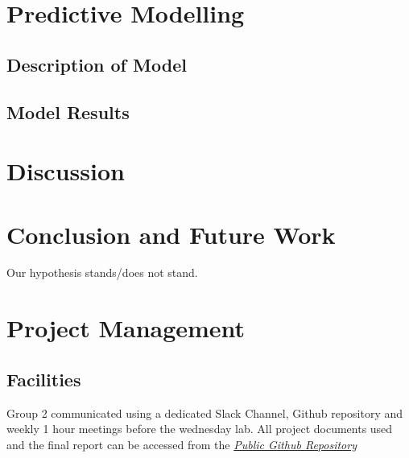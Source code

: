 \documentclass[10pt]{article}\usepackage[]{graphicx}\usepackage[]{color}
\begin{document}
\section{Predictive Modelling}
\subsection{Description of Model}
\subsection{Model Results}

\section{Discussion}

\section{Conclusion and Future Work}\label{cdsmote1}

Our hypothesis stands/does not stand.







\section{Project Management}\label{mgt}
\subsection{Facilities}
Group 2 communicated using a dedicated Slack Channel, Github repository and weekly 1 hour meetings before the wednesday lab.
All project documents used and the final report can be accessed from the \textit{\href{https://github.com/KarenJewell/CMM507Group2}{Public Github Repository}}
\end{document}

